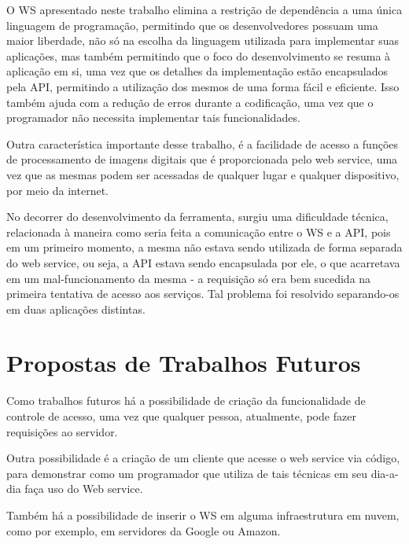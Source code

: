 \documentclass[12pt]{article}
\begin{document}

O WS apresentado neste trabalho elimina a restrição de dependência a uma
única linguagem de programação, permitindo que os desenvolvedores possuam uma maior
liberdade, não só na escolha da linguagem utilizada para implementar suas aplicações,
mas também permitindo que o foco do desenvolvimento se resuma à aplicação em si,
uma vez que os detalhes da implementação estão encapsulados pela API,
permitindo a utilização dos mesmos de uma forma fácil e eficiente. Isso também ajuda com a redução de erros durante a codificação, uma vez que o programador não necessita implementar tais funcionalidades.

Outra característica importante desse trabalho, é a facilidade de acesso a funções de processamento de imagens digitais que é proporcionada pelo web service, uma vez que as mesmas podem ser acessadas de qualquer lugar e qualquer dispositivo, por meio da internet.

No decorrer do desenvolvimento da ferramenta, surgiu uma dificuldade técnica, relacionada à maneira como seria feita a comunicação entre o WS e a API, pois em um primeiro momento, a mesma não estava sendo utilizada de forma separada do web service, ou seja, a API estava sendo encapsulada por ele, o que acarretava em um mal-funcionamento da mesma - a requisição só era bem sucedida na primeira tentativa de acesso aos serviços. Tal problema foi resolvido separando-os em duas aplicações distintas.

\section{Propostas de Trabalhos Futuros}

Como trabalhos futuros há a possibilidade de criação da funcionalidade de controle de acesso, uma vez que qualquer pessoa, atualmente, pode fazer requisições ao servidor. 

Outra possibilidade é a criação de um cliente que acesse o web service via código, para demonstrar como um programador que utiliza de tais técnicas em seu dia-a-dia faça uso do Web service. 

Também há a possibilidade de inserir o WS em alguma infraestrutura em nuvem, como por exemplo, em servidores da Google ou Amazon.






\end{document}
